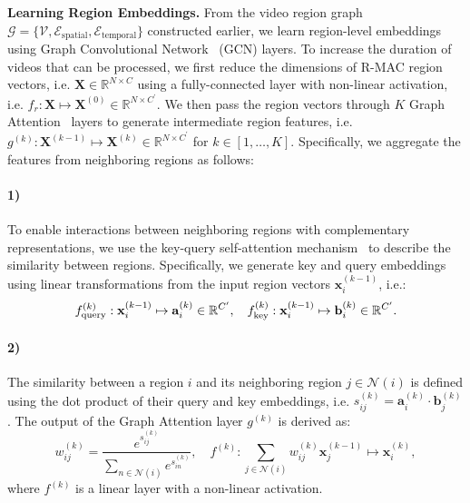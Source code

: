 \documentclass[letterpaper]{article} \usepackage{aaai22}  \usepackage{times}  \usepackage{helvet}  \usepackage{courier}  \usepackage[hyphens]{url}  \usepackage{graphicx} \urlstyle{rm} \usepackage{amsmath}
\begin{document}
\textbf{Learning Region Embeddings.} From the video region graph $\mathcal{G} = \{\mathcal{V}, \mathcal{E}_\text{spatial}, \mathcal{E}_\text{temporal}\}$ constructed earlier, we learn region-level embeddings using Graph Convolutional Network~\cite{gcn, graph-attention} (GCN) layers. To increase the duration of videos that can be processed, we first reduce the dimensions of R-MAC region vectors, i.e. $\mathbf{X} \in \mathbb{R}^{N\times C}$ using a fully-connected layer with non-linear activation, i.e. $f_{r}: \mathbf{X} \mapsto \mathbf{X}^{(0)} \in \mathbb{R}^{N\times C^\prime}$.
We then pass the region vectors through $K$ Graph Attention~\cite{graph-attention} layers to generate intermediate region features, i.e. $g^{(k)}: \mathbf{X}^{(k-1)} \mapsto \mathbf{X}^{(k)} \in \mathbb{R}^{N \times C^\prime}$ for $k \in \left[1, \ldots, K\right]$. Specifically, we aggregate the features from neighboring regions as follows: 

\paragraph{1)} To enable interactions between neighboring regions with complementary representations, we use the key-query self-attention mechanism~\cite{attention-is-all-you-need} to describe the similarity between regions. Specifically, we generate key and query embeddings using linear transformations from the input region vectors $\mathbf{x}_i^{(k-1)}$, i.e.:
\begin{equation}
\small
f_\text{query}^{(k)} : \mathbf{x}_i^{(k-1)} \mapsto \mathbf{a}_i^{(k)} \in \mathbb{R}^{C^\prime}, \quad
        f_\text{key}^{(k)} : \mathbf{x}_i^{(k-1)} \mapsto \mathbf{b}_i^{(k)} \in \mathbb{R}^{C^\prime}.
\label{eqn:kq-embeddings}
\end{equation}

\vspace{-2mm}
\paragraph{2)} The similarity between a region $i$ and its neighboring region $j \in \mathcal{N}(i)$ is defined using the dot product of their query and key embeddings, i.e. $s_{ij}^{(k)}= \mathbf{a}_i^{(k)} \cdot \mathbf{b}_{j}^{(k)}$. The output of the Graph Attention layer $g^{(k)}$ is derived as:
\begin{equation}
w_{ij}^{(k)} = \frac{e^{s_{ij}^{(k)}}}{\sum_{n \in \mathcal{N}(i)}{e^{s_{in}^{(k)}}}}, \quad
       f^{(k)} : \sum_{j \in \mathcal{N}(i)} w_{ij}^{(k)} \mathbf{x}_{j}^{(k-1)} \mapsto \mathbf{x}_i^{(k)},
\end{equation}
where $f^{(k)}$ is a linear layer with a non-linear activation.
\end{document}
